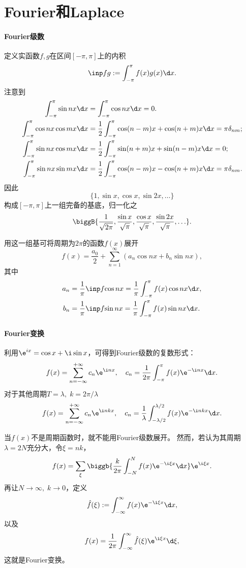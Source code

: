 \section{Fourier和Laplace}

\paragraph{Fourier级数}
定义实函数$f,g$在区间$[-\pi,\pi]$上的内积
\[\inp fg:=\int_{-\pi}^\pi f(x)g(x)\d x.\]
注意到
\begin{subequations}
	\label{eqn:intsincos}
	\begin{align}
		\int_{-\pi}^\pi\sin nx\d x&=\int_{-\pi}^\pi\cos nx\d x=0.\\
		\int_{-\pi}^\pi\cos nx\cos mx\d x & =\frac12\int_{-\pi}^\pi\cos(n-m)x+\cos(n+m)x\d x=\pi\delta_{nm};\\
		\int_{-\pi}^\pi\sin nx\cos mx\d x & =\frac12\int_{-\pi}^\pi\sin(n+m)x+\sin(n-m)x\d x=0; \\             
		\int_{-\pi}^\pi\sin nx\sin mx\d x & =\frac12\int_{-\pi}^\pi\cos(n-m)x-\cos(n+m)x\d x=\pi\delta_{nm} .
	\end{align}
\end{subequations}
因此
\[\{1,\sin x,\cos x,\sin2x,\ldots\}\]
构成$[-\pi,\pi]$上一组完备的基底，归一化之
\[\biggB{\frac1{\sqrt{2\pi}},\frac{\sin x}{\sqrt\pi},\frac{\cos x}{\sqrt\pi},\frac{\sin2x}{\sqrt\pi},\ldots}.\]

用这一组基可将周期为$2\pi$的函数$f(x)$展开
\[f(x)=\frac{a_0}2+\sum_{n=1}^\infty(a_n\cos nx+b_n\sin nx),\]
其中
\begin{align*}
	a_n & =\frac1\pi\inp f{\cos nx}=\frac1\pi\int_{-\pi}^\pi f(x)\cos nx\d x, \\
	b_n & =\frac1\pi\inp f{\sin nx}=\frac1\pi\int_{-\pi}^\pi f(x)\sin nx\d x.
\end{align*}

\paragraph{Fourier变换}
利用$\e^{ix}=\cos x+\i\sin x$，可得到Fourier级数的复数形式：
\[f(x)=\sum_{n=-\infty}^{+\infty}c_n\e^{\i nx},\quad c_n=\frac1{2\pi}\int_{-\pi}^\pi f(x)\e^{-\i nx}\d x.\]
对于其他周期$T=\lambda,\;k=2\pi/\lambda$
\[f(x)=\sum_{n=-\infty}^{+\infty}c_n\e^{\i nkx},\quad c_n=\frac1\lambda\int_{-\lambda/2}^{\lambda/2} f(x)\e^{-\i nkx}\d x.\]

当$f(x)$不是周期函数时，就不能用Fourier级数展开。
然而，若认为其周期$\lambda=2N$充分大，令$\xi=nk$，
\[f(x)=\sum_\xi\biggb{\frac{k}{2\pi}\int_{-N}^Nf(x)\e^{-\i\xi x}\d x}\e^{\i\xi x}.\]
再让$N\to\infty,\;k\to0$，定义
\[\hat f(\xi):=\int_{-\infty}^\infty f(x)\e^{-\i\xi x}\d x,\]
以及
\[f(x)=\frac1{2\pi}\int_{-\infty}^\infty\hat f(\xi)\e^{\i\xi x}\d\xi,\]
这就是Fourier变换。

